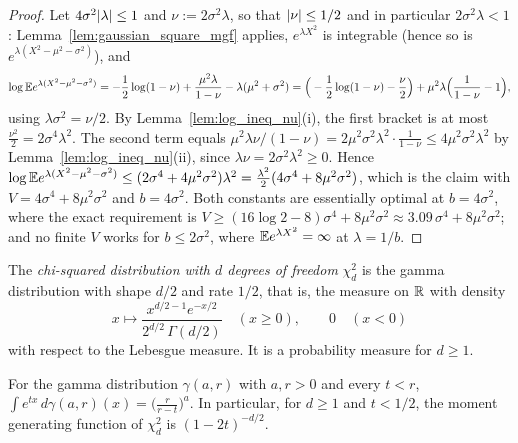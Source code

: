 \begin{proof}
\leanok
{}
Let $4\sigma^2\lvert \lambda \rvert \le 1$ and $\nu := 2\sigma^2\lambda$, so that $\lvert \nu \rvert \le 1/2$ and in
particular $2\sigma^2\lambda < 1$: Lemma~\ref{lem:gaussian_square_mgf} applies, $e^{\lambda X^2}$
is integrable (hence so is $e^{\lambda(X^2 - \mu^2 - \sigma^2)}$), and
\[
  \log\mathbb{E} e^{\lambda(X^2 - \mu^2 - \sigma^2)}
  = -\frac12\log(1-\nu) + \frac{\mu^2\lambda}{1-\nu} - \lambda(\mu^2 + \sigma^2)
  = \Big(-\frac12\log(1-\nu) - \frac\nu2\Big) + \mu^2\lambda\Big(\frac{1}{1-\nu} - 1\Big),
\]
using $\lambda\sigma^2 = \nu/2$. By Lemma~\ref{lem:log_ineq_nu}(i), the first bracket is at most
$\frac{\nu^2}{2} = 2\sigma^4\lambda^2$. The second term equals
$\mu^2\lambda\nu/(1-\nu) = 2\mu^2\sigma^2\lambda^2\cdot\frac{1}{1-\nu} \le 4\mu^2\sigma^2\lambda^2$
by Lemma~\ref{lem:log_ineq_nu}(ii), since $\lambda\nu = 2\sigma^2\lambda^2 \ge 0$. Hence
$\log\mathbb{E} e^{\lambda(X^2-\mu^2-\sigma^2)} \le (2\sigma^4 + 4\mu^2\sigma^2)\lambda^2 = \frac{\lambda^2}{2}(4\sigma^4 + 8\mu^2\sigma^2)$,
which is the claim with $V = 4\sigma^4 + 8\mu^2\sigma^2$ and $b = 4\sigma^2$. Both constants are
essentially optimal at $b = 4\sigma^2$, where the exact requirement is
$V \ge (16\log2-8)\sigma^4 + 8\mu^2\sigma^2 \approx 3.09\,\sigma^4 + 8\mu^2\sigma^2$; and no finite
$V$ works for $b \le 2\sigma^2$, where $\mathbb{E} e^{\lambda X^2} = \infty$ at $\lambda = 1/b$.
\end{proof}

\begin{definition}\label{def:chi_squared}
\leanok
The \emph{chi-squared distribution with $d$ degrees of freedom} $\chi^2_d$ is the gamma
distribution with shape $d/2$ and rate $1/2$, that is, the measure on $\mathbb{R}$ with density
\[
  x \mapsto \frac{x^{d/2-1}e^{-x/2}}{2^{d/2}\,\Gamma(d/2)} \quad (x \ge 0), \qquad 0 \quad (x < 0)
\]
with respect to the Lebesgue measure. It is a probability measure for $d \ge 1$.
\end{definition}

\begin{lemma}
\label{lem:mgf_chi_squared}
\leanok
{}
For the gamma distribution $\gamma(a,r)$ with $a, r > 0$ and every $t < r$,
$\int e^{tx}\,d\gamma(a,r)(x) = \big(\frac{r}{r-t}\big)^a$. In particular, for $d \ge 1$ and
$t < 1/2$, the moment generating function of $\chi^2_d$ is $(1-2t)^{-d/2}$.
\end{lemma}

